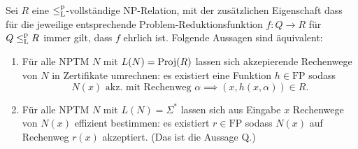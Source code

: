 \begin{lemma}\label{lemma:q-generalized}
Sei $R$ eine $\leq_\mathrm{L}^\mathrm{p}$-vollständige NP-Relation, mit der zusätzlichen Eigenschaft dass für die jeweilige entsprechende Problem-Reduktionsfunktion $f\colon Q\to R$ für $Q\leq_\mathrm{L}^\mathrm{p} R$ immer gilt, dass $f$ ehrlich ist. %
Folgende Aussagen sind äquivalent:
\begin{enumerate}
    \item Für alle NPTM $N$ mit $L(N)=\operatorname{Proj}(R)$ lassen sich akzepierende Rechenwege von $N$ in Zertifikate umrechnen: es existiert eine Funktion $h\in\mathrm{FP}$ sodass
        \[ N(x) \text{ akz. mit Rechenweg $\alpha$} \implies (x,h(x,\alpha))\in R. \]
    \item Für alle NPTM $N$ mit $L(N)=\Sigma^*$ lassen sich aus Eingabe $x$ Rechenwege von $N(x)$ effizient bestimmen: es existiert $r\in\mathrm{FP}$ sodass $N(x)$ auf Rechenweg $r(x)$ akzeptiert. (Das ist die Aussage Q.)
\end{enumerate}
\end{lemma}


